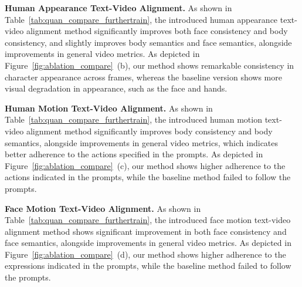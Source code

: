 \noindent\textbf{Human Appearance Text-Video Alignment.} As shown in Table~\ref{tab:quan_compare_furthertrain}, the introduced human appearance text-video alignment method significantly improves both face consistency and body consistency, and slightly improves body semantics and face semantics, alongside improvements in general video metrics. As depicted in Figure~\ref{fig:ablation_compare}~(b), our method shows remarkable consistency in character appearance across frames, whereas the baseline version shows more visual degradation in appearance, such as the face and hands.

\noindent\textbf{Human Motion Text-Video Alignment.} As shown in Table~\ref{tab:quan_compare_furthertrain}, the introduced human motion text-video alignment method significantly improves body consistency and body semantics, alongside improvements in general video metrics, which indicates better adherence to the actions specified in the prompts. As depicted in Figure~\ref{fig:ablation_compare}~(c), our method shows higher adherence to the actions indicated in the prompts, while the baseline method failed to follow the prompts.

\noindent\textbf{Face Motion Text-Video Alignment.} As shown in Table~\ref{tab:quan_compare_furthertrain}, the introduced face motion text-video alignment method shows significant improvement in both face consistency and face semantics, alongside improvements in general video metrics. As depicted in Figure~\ref{fig:ablation_compare}~(d), our method shows higher adherence to the expressions indicated in the prompts, while the baseline method failed to follow the prompts.






